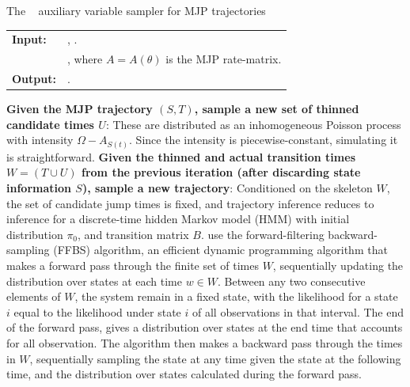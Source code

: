 \begin{algorithm}[H]
  \caption{The {\algname}~\cite{RaoTeh13} auxiliary variable sampler for MJP trajectories}
   \label{alg:Unif_gibbs}
  \begin{tabular}{l l}
   \textbf{Input:  } & \text{MJP parameters $\theta$ and $\pi_0$, observations $X$}, 
                       \text{the previous path $S(t) = (S, T)$}.\\ 
                     & \text{A  parameter $\Omega > \max_i A_i$}, where
   $A = A(\theta)$ is the MJP rate-matrix.\\
   \textbf{Output:  }& \text{A new MJP trajectory $S' (t) = (S', T')$}.\\
   \hline
   \end{tabular}
   \begin{algorithmic}[1]
\State \textbf{Given the MJP trajectory $(S,T)$, sample a new set of thinned 
candidate times $U$}: %
These are distributed as an inhomogeneous Poisson process with intensity 
$\Omega-A_{S(t)}$. Since the intensity is piecewise-constant, simulating it 
is straightforward.
\State \textbf{Given the thinned and actual transition times $W = (T \cup U)$
from the previous iteration (after discarding state information $S$), 
sample a new trajectory}:
    Conditioned on the skeleton $W$, the set of candidate jump
    times is fixed, and trajectory inference reduces to inference for
    a discrete-time hidden Markov model (HMM) with initial distribution
    $\pi_0$, and transition matrix $B$. \cite{RaoTeh13} use the forward-filtering
    backward-sampling (FFBS) algorithm, an efficient dynamic 
    programming algorithm that makes a forward pass through the
    finite set of times $W$, sequentially updating the 
    distribution over states at each time $w \in W$. 
    Between any two consecutive elements of $W$,
    the system remain in a fixed state, with the likelihood for a state $i$ equal
    to the likelihood under state $i$ of all observations 
    in that interval. 
    The end of the forward pass, gives a distribution over states at the
    end time that accounts for all observation.
    The algorithm then makes a backward pass through the times in $W$, 
    sequentially sampling the state at any time given the state at the 
    following time, and the distribution over states calculated during the
    forward pass. 
\end{algorithmic}
\end{algorithm}

